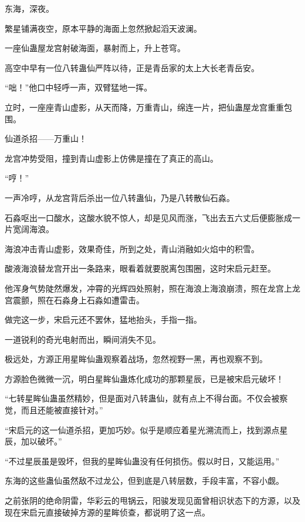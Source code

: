 
\begin{this_body}



东海，深夜。

繁星铺满夜空，原本平静的海面上忽然掀起滔天波澜。

一座仙蛊屋龙宫射破海面，暴射而上，升上苍穹。

高空中早有一位八转蛊仙严阵以待，正是青岳家的太上大长老青岳安。

“咄！”他口中轻呼一声，双臂猛地一挥。

立时，一座座青山虚影，从天而降，万重青山，绵连一片，把仙蛊屋龙宫重重包围。

仙道杀招——万重山！

龙宫冲势受阻，撞到青山虚影上仿佛是撞在了真正的高山。

“哼！”

一声冷哼，从龙宫背后杀出一位八转蛊仙，乃是八转散仙石淼。

石淼呕出一口酸水，这酸水貌不惊人，却是见风而涨，飞出去五六丈后便膨胀成一片宽阔海浪。

海浪冲击青山虚影，效果奇佳，所到之处，青山消融如火焰中的积雪。

酸液海浪替龙宫开出一条路来，眼看着就要脱离包围圈，这时宋启元赶至。

他浑身气势陡然爆发，冲霄的光辉四处照射，照在海浪上海浪崩溃，照在龙宫上龙宫震颤，照在石淼身上石淼如遭雷击。

做完这一步，宋启元还不罢休，猛地抬头，手指一指。

一道锐利的奇光电射而出，瞬间消失不见。

极远处，方源正用星眸仙蛊观察着战场，忽然视野一黑，再也观察不到。

方源脸色微微一沉，明白星眸仙蛊炼化成功的那颗星辰，已是被宋启元破坏！

“七转星眸仙蛊虽然精妙，但是面对八转蛊仙，就有点上不得台面。不仅会被察觉，而且还能被直接针对。”

“宋启元的这一仙道杀招，更加巧妙。似乎是顺应着星光溯流而上，找到源点星辰，加以破坏。”

“不过星辰虽是毁坏，但我的星眸仙蛊没有任何损伤。假以时日，又能运用。”

东海的这些蛊仙虽然敌不过龙公，但到底是八转层数，手段丰富，不容小觑。

之前张阴的绝命阴雷，华彩云的甩锅云，阳骏发现见面曾相识状态下的方源，以及现在宋启元直接破掉方源的星眸侦查，都说明了这一点。


\end{this_body}
